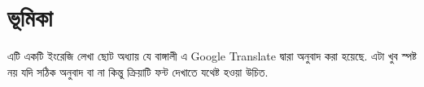 \documentclass[10pt]{article}
\begin{document}
\tableofcontents


\section{ভূমিকা}
এটি একটি ইংরেজি লেখা ছোট অধ্যায় যে বাঙ্গালী এ \textenglish{Google Translate} দ্বারা অনুবাদ করা হয়েছে. এটা খুব স্পষ্ট নয় যদি সঠিক অনুবাদ বা না কিন্তু ক্রিয়াটি ফন্ট দেখাতে যথেষ্ট হওয়া উচিত.
\end{document}
